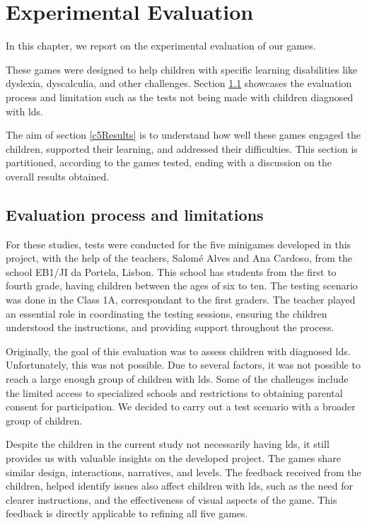 \chapter{Experimental Evaluation}
\label{cha:results}

In this chapter, we report on the experimental evaluation of our games.

These games were designed to help children with specific learning disabilities like dyslexia, dyscalculia, and other challenges. Section \ref{c5TestProcess} showcases the evaluation process and limitation such as the tests not being made with children diagnosed with \gls{ld}s.

The aim of section \ref{c5Results} is to understand how well these games engaged the children, supported their learning, and addressed their difficulties. This section is partitioned, according to the games tested, ending with a discussion on the overall results obtained.


\newpage

\section{Evaluation process and limitations}
\label{c5TestProcess}

For these studies, tests were conducted for the five minigames developed in this project, with the help of the teachers, Salomé Alves and Ana Cardoso, from the school EB1/JI da Portela, Lisbon. This school has students from the first to fourth grade, having children between the ages of six to ten.
The testing scenario was done in the Class 1A, correspondant to the first graders.
The teacher played an essential role in coordinating the testing sessions, ensuring the children understood the instructions, and providing support throughout the process.

Originally, the goal of this evaluation was to assess children with diagnosed \gls{ld}s. Unfortunately, this was not possible. Due to several factors, it was not possible to reach a large enough group of children with \gls{ld}s. Some of the challenges include the limited access to specialized schools and restrictions to obtaining parental consent for participation. We decided to carry out a test scenario with a broader group of children.

Despite the children in the current study not necessarily having \gls{ld}s, it still provides us with valuable insights on the developed project. The games share similar design, interactions, narratives, and levels. The feedback received from the children, helped identify issues also affect children with \gls{ld}s, such as the need for clearer instructions, and the effectiveness of visual aspects of the game. This feedback is directly applicable to refining all five games.

